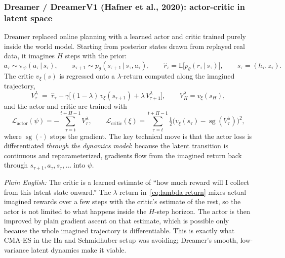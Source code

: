 \documentclass[11pt]{article}
\newcommand{\E}{\mathbb{E}}
\newcommand{\given}{\,\vert\,}
\theoremstyle{remark}
\newcommand{\plain}[1]{\medskip\noindent\textit{Plain English:} #1\medskip}
\newcommand{\sg}{\operatorname{sg}}
\begin{document}
\subsubsection*{Dreamer / DreamerV1 (Hafner et al., 2020): actor-critic in latent space}

Dreamer replaced online planning with a learned actor and critic trained purely inside the world model. Starting from posterior states drawn from replayed real data, it imagines $H$ steps with the prior:
\begin{equation}
  a_\tau \sim \pi_\psi(a_\tau \given s_\tau), \qquad
  s_{\tau+1} \sim p_\theta(s_{\tau+1}\given s_\tau, a_\tau), \qquad
  \hat r_\tau = \E\big[p_\theta(r_\tau \given s_\tau)\big], \qquad s_\tau = (h_\tau, z_\tau).
  \label{eq:dreamer-imagine}
\end{equation}
The critic $v_\xi(s)$ is regressed onto a $\lambda$-return computed along the imagined trajectory,
\begin{equation}
  V^\lambda_\tau \;=\; \hat r_\tau + \gamma\Big[(1-\lambda)\, v_\xi(s_{\tau+1}) + \lambda\, V^\lambda_{\tau+1}\Big],
  \qquad V^\lambda_{H} = v_\xi(s_H),
  \label{eq:lambda-return}
\end{equation}
and the actor and critic are trained with
\begin{equation}
  \mathcal L_{\text{actor}}(\psi) = -\sum_{\tau=t}^{t+H-1} V^\lambda_\tau, \qquad
  \mathcal L_{\text{critic}}(\xi) = \sum_{\tau=t}^{t+H-1} \tfrac12\big(v_\xi(s_\tau) - \sg(V^\lambda_\tau)\big)^2,
  \label{eq:dreamer-ac}
\end{equation}
where $\sg(\cdot)$ stops the gradient. The key technical move is that the actor loss is differentiated \emph{through the dynamics model}: because the latent transition is continuous and reparameterized, gradients flow from the imagined return back through $s_{\tau+1}, a_\tau, s_\tau, \dots$ into $\psi$.

\plain{The critic is a learned estimate of ``how much reward will I collect from this latent state onward.'' The $\lambda$-return in~\eqref{eq:lambda-return} mixes actual imagined rewards over a few steps with the critic's estimate of the rest, so the actor is not limited to what happens inside the $H$-step horizon. The actor is then improved by plain gradient ascent on that estimate, which is possible only because the whole imagined trajectory is differentiable. This is exactly what CMA-ES in the Ha and Schmidhuber setup was avoiding; Dreamer's smooth, low-variance latent dynamics make it viable.}
\end{document}
